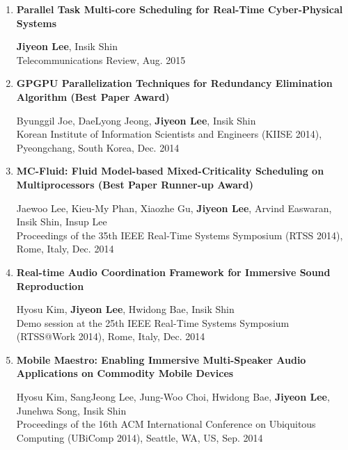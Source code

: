 \documentclass[11pt,letterpaper]{article}
\begin{document}
\begin{enumerate}
	\item \textbf{Parallel Task Multi-core Scheduling for Real-Time Cyber-Physical Systems} \\
	\begin{small}
		\textbf{Jiyeon Lee}, Insik Shin\\ 
		Telecommunications Review, Aug. 2015
	\end{small}

	\item \textbf{GPGPU Parallelization Techniques for Redundancy Elimination Algorithm (Best Paper Award)} \\
	\begin{small}
		Byunggil Joe, DaeLyong Jeong, \textbf{Jiyeon Lee}, Insik Shin\\ 
		Korean Institute of Information Scientists and Engineers (KIISE 2014), Pyeongchang, South Korea, Dec. 2014
	\end{small}

	\item \textbf{MC-Fluid: Fluid Model-based Mixed-Criticality Scheduling on Multiprocessors (Best Paper Runner-up Award)} \\
	\begin{small}
		Jaewoo Lee, Kieu-My Phan, Xiaozhe Gu, \textbf{Jiyeon Lee}, Arvind Easwaran, Insik Shin, Insup Lee\\ 
		Proceedings of the 35th IEEE Real-Time Systems Symposium (RTSS 2014), Rome, Italy, Dec. 2014
	\end{small}

	\item \textbf{Real-time Audio Coordination Framework for Immersive Sound Reproduction} \\
	\begin{small}
		Hyosu Kim, \textbf{Jiyeon Lee}, Hwidong Bae, Insik Shin\\ 
		Demo session at the 25th IEEE Real-Time Systems Symposium (RTSS@Work 2014), Rome, Italy, Dec. 2014
	\end{small}

	\item \textbf{Mobile Maestro: Enabling Immersive Multi-Speaker Audio Applications on Commodity Mobile Devices} \\
	\begin{small}
		Hyosu Kim, SangJeong Lee, Jung-Woo Choi, Hwidong Bae, \textbf{Jiyeon Lee}, Junehwa Song, Insik Shin\\ 
		Proceedings of the 16th ACM International Conference on Ubiquitous Computing (UBiComp 2014), Seattle, WA, US, Sep. 2014
	\end{small}


\end{enumerate}
\end{document}
